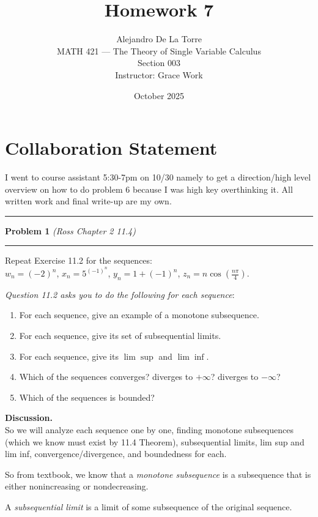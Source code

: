 \documentclass[12pt]{article}
\title{Homework 7}
\author{Alejandro De La Torre \\ MATH 421 — The Theory of Single Variable Calculus \\ Section 003 \\ Instructor: Grace Work}
\date{October 2025}
\newcommand{\problem}[2][]{%
  \vspace{0.5em}
  \hrule\vspace{0.4em}
  \textbf{Problem #2}\if\relax\detokenize{#1}\relax\else\; \textit{(#1)}\fi
  \vspace{0.25em}\hrule\vspace{0.8em}
}
\begin{document}
\maketitle

\section*{Collaboration Statement}
I went to course assistant 5:30-7pm on 10/30 namely to get a direction/high level overview on how to do problem 6 because I was high key overthinking it. All written work and final write-up are my own.

\bigskip

\problem[Ross Chapter 2 11.4]{1}
Repeat Exercise 11.2 for the sequences: \\
$w_n = (-2)^n$, $x_n= 5 ^{(-1)^{n}}$, $y_n=1+(-1)^n$, $z_n=n \cos(\frac{n \pi}{4})$.\\
\vspace{0.05cm}

\textit{Question 11.2 asks you to do the following for each sequence}:

\begin{enumerate}[label=(\alph*)]
    \item For each sequence, give an example of a monotone subsequence.
    \item For each sequence, give its set of subsequential limits.
    \item For each sequence, give its $\lim \sup$ and $\lim \inf$.
    \item Which of the sequences converges? diverges to $+\infty$? diverges to $-\infty$?
    \item Which of the sequences is bounded?
\end{enumerate}
\vspace{0.75em}

\textbf{Discussion.} \\
So we will analyze each sequence one by one, finding monotone subsequences (which we know must exist by 11.4 Theorem), subsequential limits, lim sup and lim inf, convergence/divergence, and boundedness for each.

So from textbook, we know that a \textit{monotone subsequence} is a subsequence that is either nonincreasing or nondecreasing. 

A \textit{subsequential limit} is a limit of some subsequence of the original sequence. 
\end{document}
